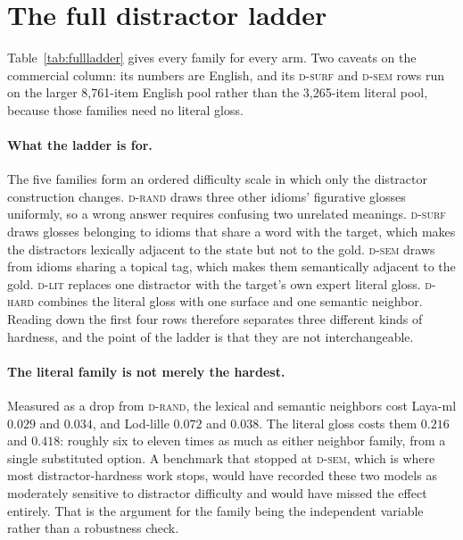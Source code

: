 \documentclass[11pt]{article}
\newcommand{\Drand}{\textsc{d-rand}}
\newcommand{\Dsurf}{\textsc{d-surf}}
\newcommand{\Dsem}{\textsc{d-sem}}
\newcommand{\Dlit}{\textsc{d-lit}}
\newcommand{\Dhard}{\textsc{d-hard}}
\begin{document}
\section{The full distractor ladder}
\label{app:ladder}

Table~\ref{tab:fullladder} gives every family for every arm. Two caveats on the
commercial column: its numbers are English, and its \Dsurf{} and \Dsem{} rows
run on the larger 8{,}761-item English pool rather than the 3{,}265-item
literal pool, because those families need no literal gloss.

\paragraph{What the ladder is for.} The five families form an ordered difficulty
scale in which only the distractor construction changes. \Drand{} draws three
other idioms' figurative glosses uniformly, so a wrong answer requires confusing
two unrelated meanings. \Dsurf{} draws glosses belonging to idioms that share a
word with the target, which makes the distractors lexically adjacent to the state
but not to the gold. \Dsem{} draws from idioms sharing a topical tag, which makes
them semantically adjacent to the gold. \Dlit{} replaces one distractor with the
target's own expert literal gloss. \Dhard{} combines the literal gloss with one
surface and one semantic neighbor. Reading down the first four rows therefore
separates three different kinds of hardness, and the point of the ladder is that
they are not interchangeable.

\paragraph{The literal family is not merely the hardest.} Measured as a drop from
\Drand{}, the lexical and semantic neighbors cost Laya-ml $0.029$ and $0.034$,
and Lod-lille $0.072$ and $0.038$. The literal gloss costs them $0.216$ and
$0.418$: roughly six to eleven times as much as either neighbor family, from a
single substituted option. A benchmark that stopped at \Dsem{}, which is where
most distractor-hardness work stops, would have recorded these two models as
moderately sensitive to distractor difficulty and would have missed the effect
entirely. That is the argument for the family being the independent variable
rather than a robustness check.
\end{document}
